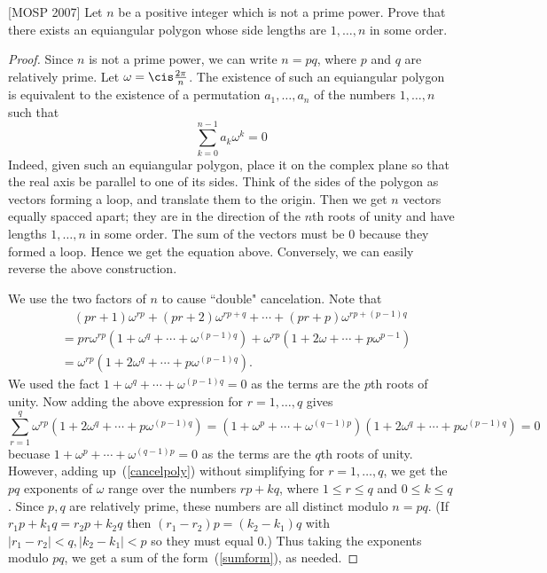 \begin{ex}\label{polyg}[MOSP 2007] Let $n$ be a positive integer which is not a prime power. Prove that there exists an equiangular polygon whose side lengths are $1,\ldots, n$ in some order.
\end{ex}
\begin{proof}
Since $n$ is not a prime power, we can write $n=pq$, where $p$ and $q$ are relatively prime. Let $\omega=\cis\frac{2\pi}{n}$. The existence of such an equiangular polygon is equivalent to the existence of a permutation $a_1,\ldots, a_n$ of the numbers $1,\ldots, n$ such that
\begin{equation}\label{sumform}
\sum_{k=0}^{n-1} a_k\omega^k=0
\end{equation}
Indeed, given such an equiangular polygon, place it on the complex plane so that the real axis be parallel to one of its sides. Think of the sides of the polygon as vectors forming a loop, and translate them to the origin. Then we get $n$ vectors equally spacced apart; they are in the direction of the $n$th roots of unity and have lengths $1,\ldots, n$ in some order. The sum of the vectors must be 0 because they formed a loop. Hence we get the equation above. Conversely, we can easily reverse the above construction.

We use the two factors of $n$ to cause ``double" cancelation. Note that
\begin{align}
\label{cancelpoly}
&\quad (pr+1)\omega^{rp}+(pr+2)\omega^{rp+q}+\cdots +(pr+p)\omega^{rp+(p-1)q}\\
\nonumber
 &=pr\omega^{rp}(1+\omega^q+\cdots +\omega^{(p-1)q})+\omega^{rp}(1+2\omega+\cdots +p\omega^{p-1})\\
\nonumber &=\omega^{rp}(1+2\omega^q+\cdots +p\omega^{(p-1)q}).
\end{align}
We used the fact $1+\omega^q+\cdots +\omega^{(p-1)q}=0$ as the terms are the $p$th roots of unity. Now adding the above expression for $r=1,\ldots, q$ gives
\[\sum_{r=1}^q\omega^{rp}(1+2\omega^q+\cdots +p\omega^{(p-1)q})
=(1+\omega^{p}+\cdots +\omega^{(q-1)p})(1+2\omega^q+\cdots +p\omega^{(p-1)q})=0\]
becuase $1+\omega^p+\cdots +\omega^{(q-1)p}=0$ as the terms are the $q$th roots of unity. However, adding up~(\ref{cancelpoly}) without simplifying for $r=1,\ldots, q$, we get the $pq$ exponents of $\omega$ range over the numbers $rp+kq$, where $1\leq r\leq q$ and $0\leq k\leq q$. Since $p,q$ are relatively prime, these numbers are all distinct modulo $n=pq$. (If $r_1p+k_1q=r_2p+k_2q$ then $(r_1-r_2)p=(k_2-k_1)q$ with $|r_1-r_2|<q,|k_2-k_1|<p$ so they must equal 0.) Thus taking the exponents modulo $pq$, we get a sum of the form~(\ref{sumform}), as needed.
\end{proof}

